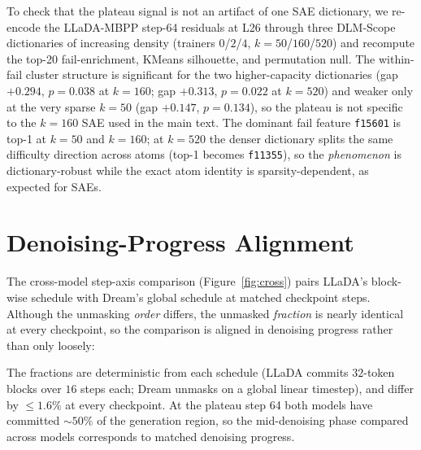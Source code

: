 \documentclass[11pt]{article}
\begin{document}
To check that the plateau signal is not an artifact of one SAE dictionary, we re-encode the LLaDA-MBPP step-64 residuals at L26 through three DLM-Scope dictionaries of increasing density (trainers $0$/$2$/$4$, $k\!=\!50$/$160$/$520$) and recompute the top-20 fail-enrichment, KMeans silhouette, and permutation null.
The within-fail cluster structure is significant for the two higher-capacity dictionaries (gap $+0.294$, $p\!=\!0.038$ at $k\!=\!160$; gap $+0.313$, $p\!=\!0.022$ at $k\!=\!520$) and weaker only at the very sparse $k\!=\!50$ (gap $+0.147$, $p\!=\!0.134$), so the plateau is not specific to the $k\!=\!160$ SAE used in the main text.
The dominant fail feature \texttt{f15601} is top-1 at $k\!=\!50$ and $k\!=\!160$; at $k\!=\!520$ the denser dictionary splits the same difficulty direction across atoms (top-1 becomes \texttt{f11355}), so the \emph{phenomenon} is dictionary-robust while the exact atom identity is sparsity-dependent, as expected for SAEs.

\section{Denoising-Progress Alignment}
\label{sec:appendix_unmask}

The cross-model step-axis comparison (Figure~\ref{fig:cross}) pairs LLaDA's block-wise schedule with Dream's global schedule at matched checkpoint steps.
Although the unmasking \emph{order} differs, the unmasked \emph{fraction} is nearly identical at every checkpoint, so the comparison is aligned in denoising progress rather than only loosely:

\begin{center}
\end{center}

\noindent The fractions are deterministic from each schedule (LLaDA commits $32$-token blocks over $16$ steps each; Dream unmasks on a global linear timestep), and differ by $\le 1.6\%$ at every checkpoint. At the plateau step 64 both models have committed $\sim$$50\%$ of the generation region, so the mid-denoising phase compared across models corresponds to matched denoising progress.
\end{document}
